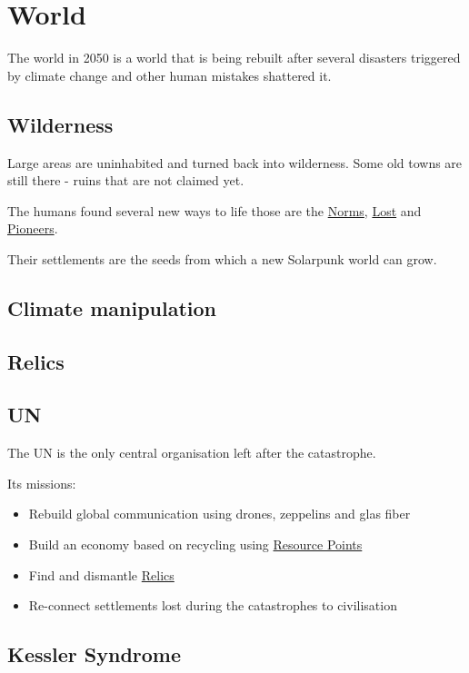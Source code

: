 \chapter{World}

The world in 2050 is a world that is being rebuilt after several disasters triggered by climate change and other human mistakes shattered it.

\section{Wilderness}

Large areas are uninhabited and turned back into wilderness. Some old towns are still there - ruins that are not claimed yet.

The humans found several new ways to life those are the \hyperref[sec: Norms]{Norms}, \hyperref[sec: Lost]{Lost} and \hyperref[sec: Pioneers]{Pioneers}.

Their settlements are the seeds from which a new Solarpunk world can grow.

\section{Climate manipulation}

\section{Relics}
\label{sec: Relic}

\section{UN}
\label{sec: UN}

The UN is the only central organisation left after the catastrophe.

Its missions:

\begin{itemize}
    \item Rebuild global communication using drones, zeppelins and glas fiber
    \item Build an economy based on recycling using \hyperref[sec:Resource Points]{Resource Points}
    \item Find and dismantle \hyperref[sec: Relic]{Relics}
    \item Re-connect settlements lost during the catastrophes to civilisation
\end{itemize}

\section{Kessler Syndrome}
\label{sec: Kessler Syndrome}